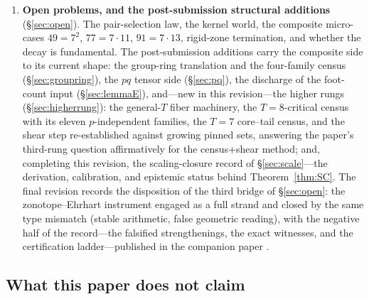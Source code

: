 \begin{enumerate}[leftmargin=1.6em,itemsep=2pt]
  H2m and the volume law H1g restated. The instrument is the census in
  different notation; it consumes the hypotheses it was commissioned to
  prove. That is the mechanism behind the type mismatch: losslessness
  forbids generated decay, and the reformulation is bounded by its own
  fidelity.
\item \textbf{Open problems, and the post-submission structural
  additions} (\S\ref{sec:open}). The pair-selection law, the kernel world,
  the composite micro-cases $49=7^2$, $77=7\cdot 11$, $91=7\cdot 13$,
  rigid-zone termination, and whether the decay is fundamental. The
  post-submission additions carry the composite side to its current
  shape: the group-ring translation and the four-family census
  (\S\ref{sec:groupring}), the $pq$ tensor side (\S\ref{sec:pq}), the
  discharge of the foot-count input (\S\ref{sec:lemmaE}), and---new in
  this revision---the higher rungs (\S\ref{sec:higherrung}): the
  general-$T$ fiber machinery, the $T=8$-critical census with its eleven
  $p$-independent families, the $T=7$ core--tail census, and the shear
  step re-established against growing pinned sets, answering the paper's
  third-rung question affirmatively for the census+shear method; and,
  completing this revision, the scaling-closure record of
  \S\ref{sec:scale}---the derivation, calibration, and epistemic status
  behind Theorem~\ref{thm:SC}. The final revision records the disposition
  of the third bridge of \S\ref{sec:open}: the zonotope--Ehrhart
  instrument engaged as a full strand and closed by the same type
  mismatch (stable arithmetic, false geometric reading), with the
  negative half of the record---the falsified strengthenings, the exact
  witnesses, and the certification ladder---published in the companion
  paper \cite{companion-paper}.
\end{enumerate}

\subsection{What this paper does not claim}

